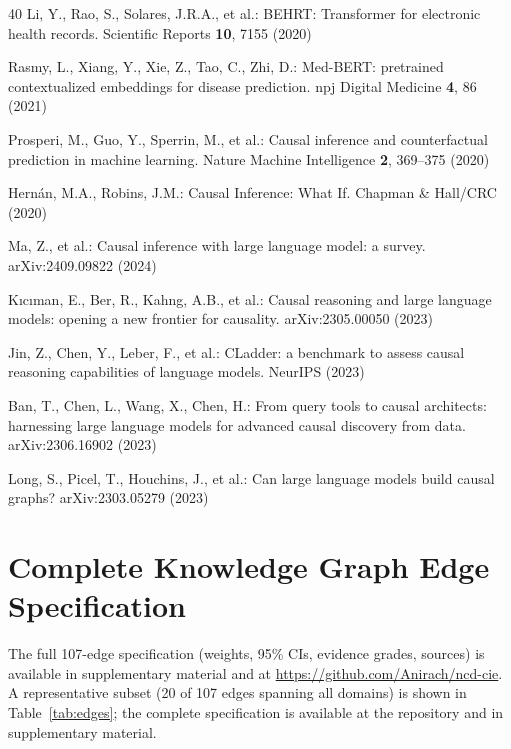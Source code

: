 \documentclass[runningheads]{llncs}
\begin{document}
\begin{thebibliography}{40}
Li, Y., Rao, S., Solares, J.R.A., et al.:
BEHRT: Transformer for electronic health records.
Scientific Reports \textbf{10}, 7155 (2020)

Rasmy, L., Xiang, Y., Xie, Z., Tao, C., Zhi, D.:
Med-BERT: pretrained contextualized embeddings for disease prediction.
npj Digital Medicine \textbf{4}, 86 (2021)

Prosperi, M., Guo, Y., Sperrin, M., et al.:
Causal inference and counterfactual prediction in machine learning.
Nature Machine Intelligence \textbf{2}, 369--375 (2020)

Hern\'{a}n, M.A., Robins, J.M.:
Causal Inference: What If.
Chapman \& Hall/CRC (2020)

Ma, Z., et al.:
Causal inference with large language model: a survey.
arXiv:2409.09822 (2024)

K{\i}c{\i}man, E., Ber, R., Kahng, A.B., et al.:
Causal reasoning and large language models: opening a new frontier
for causality.
arXiv:2305.00050 (2023)

Jin, Z., Chen, Y., Leber, F., et al.:
CLadder: a benchmark to assess causal reasoning capabilities of
language models.
NeurIPS (2023)

Ban, T., Chen, L., Wang, X., Chen, H.:
From query tools to causal architects: harnessing large language
models for advanced causal discovery from data.
arXiv:2306.16902 (2023)

Long, S., Picel, T., Houchins, J., et al.:
Can large language models build causal graphs?
arXiv:2303.05279 (2023)

\end{thebibliography}

\appendix
\section{Complete Knowledge Graph Edge Specification}\label{app:edges}

The full 107-edge specification (weights, 95\% CIs, evidence grades,
sources) is available in supplementary material and at
\url{https://github.com/Anirach/ncd-cie}.
A representative subset (20 of 107 edges spanning all domains)
is shown in Table~\ref{tab:edges}; the complete specification is
available at the repository and in supplementary material.
\end{document}
